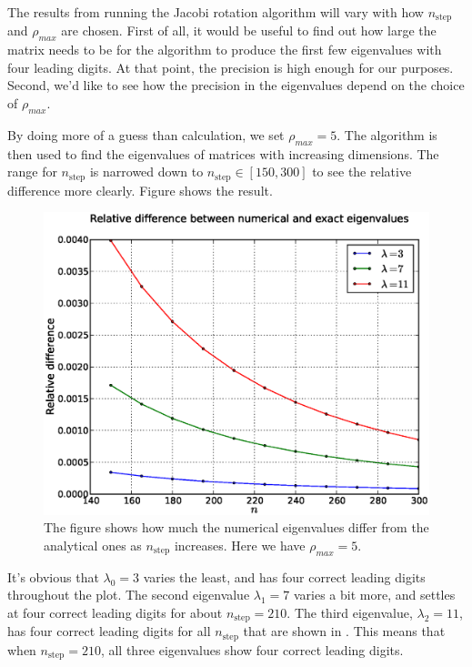 The results from running the Jacobi rotation algorithm will vary with how 
$n_{\mathrm{step}}$ and $\rho_{max}$ are chosen. First of all, it would be useful to find
out how large the matrix needs to be for the algorithm to produce the first few
eigenvalues with four leading digits. At that point, the precision is high
enough for our purposes. Second, we'd like to see how the precision in the
eigenvalues depend on the choice of $\rho_{max}$. 

By doing more of a guess than calculation, we set $\rho_{max} = 5$. The
algorithm is then used to find the eigenvalues of matrices with increasing
dimensions. The range for $n_{\mathrm{step}}$ is narrowed down to $n_{\mathrm{step}} \in 
[150,300]$ to see the relative difference more clearly. Figure  shows 
the result. 
%
\begin{figure}[htpb]
\centering
\includegraphics[width=1.0\textwidth]{images/nreldiff2.eps}
\caption{The figure shows how much the numerical eigenvalues differ from the analytical
	ones as $n_{\mathrm{step}}$ increases. Here we have $\rho_{max} = 5$.}
\label{fig:nreldiff}
\end{figure}
%
It's obvious that $\lambda_0 = 3$ varies the least, and has four correct leading digits
throughout the plot. The second eigenvalue $\lambda_1 = 7$ varies a bit more, and settles
at four correct leading digits for about $n_{\mathrm{step}} = 210$. The third eigenvalue,
$\lambda_2 = 11$, has four correct leading digits for all $n_{\mathrm{step}}$ that are shown in 
. This means that when $n_{\mathrm{step}} = 210$, all three eigenvalues show 
four correct leading digits. 

